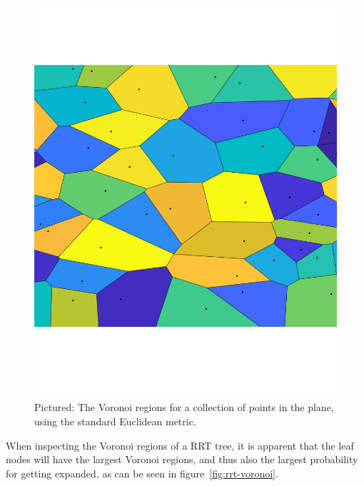 \begin{figure}
  \includegraphics[scale=.3]{figures/rrt/voronoi-diagram}
  \caption{Pictured: The Voronoi regions for a collection of points in the
    plane, using the standard Euclidean metric.}
  \label{fig:voronoi-diagram}
\end{figure}

When inspecting the Voronoi regions of a \ac{RRT} tree, it is apparent that the
leaf nodes will have the largest Voronoi regions, and thus also the largest
probability for getting expanded, as can be seen in
figure~\ref{fig:rrt-voronoi}.

